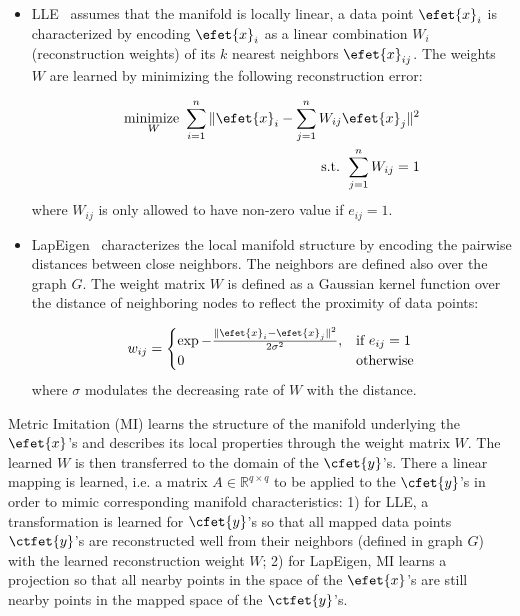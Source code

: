 \begin{enumerate} [leftmargin=4.5mm]
\begin{enumerate} [leftmargin=5mm]
   \begin{itemize} [leftmargin=4mm]
   \item LLE~\citep{lle:science00} assumes that the manifold is locally
     linear, \ie a data point $\efet{x}_i$
     is characterized by encoding $\efet{x}_i$ as a linear combination
     $W_i$ (reconstruction weights) of its $k$ nearest neighbors
     $\efet{x}_{ij}$. The weights $W$ are learned by minimizing the
     following reconstruction error: 
     
     \begin{equation}
       \label{eq:lle:error}
       \begin{aligned}
         \underset{W} {\text {minimize }} \sum_{i=1}^n \| \efet{x}_i - \sum_{j=1}^n W_{ij} \efet{x}_j \|^2 \\
        \text{s.t. }  \sum_{j=1}^n W_{ij}=1 
       \end{aligned}
     \end{equation}
     where $W_{ij}$ is only allowed to have non-zero value if
     $e_{ij}=1$. 

   \item LapEigen~\citep{eigenmaps:nips01} characterizes the local
     manifold structure by encoding the pairwise distances between
     close neighbors. The neighbors are defined also over the graph
     $G$. The weight matrix $W$ is defined as a Gaussian kernel
     function over the distance of neighboring nodes to reflect the
     proximity of data points: 
 
     \begin{equation}
       \label{eq:lap:wt} 
       w_{ij} = \begin{cases}  \exp{ -\frac{ \| \efet{x}_i - \efet{x}_j \| ^2} {2\sigma^2}}, &\text{if } e_{ij}=1  \\
                               0          &\text{otherwise}
                \end{cases}
     \end{equation}
     where $\sigma$ modulates the decreasing rate of $W$ with the
     distance.
   \end{itemize}

   Metric Imitation (MI) learns the structure of the manifold underlying
   the $\efet{x}$'s and describes its local properties through the weight 
   matrix $W$. The learned $W$ is then transferred to the domain of the
   $\cfet{y}$'s. There a linear mapping is learned, i.e. a matrix $A \in 
   \mathbb{R}^{q \times q}$ to be applied to the $\cfet{y}$'s in order to 
   mimic corresponding manifold characteristics:
   1) for LLE, a transformation is learned for $\cfet{y}$'s so that
   all mapped data points $\ctfet{y}$'s are reconstructed well from their
   neighbors (defined in graph $G$) with the learned reconstruction
   weight $W$; 2) for LapEigen, MI learns a projection so that all
   nearby points in the space of the $\efet{x}$'s are still nearby
   points in the mapped space of the $\ctfet{y}$'s.


\end{enumerate}
\end{enumerate}
